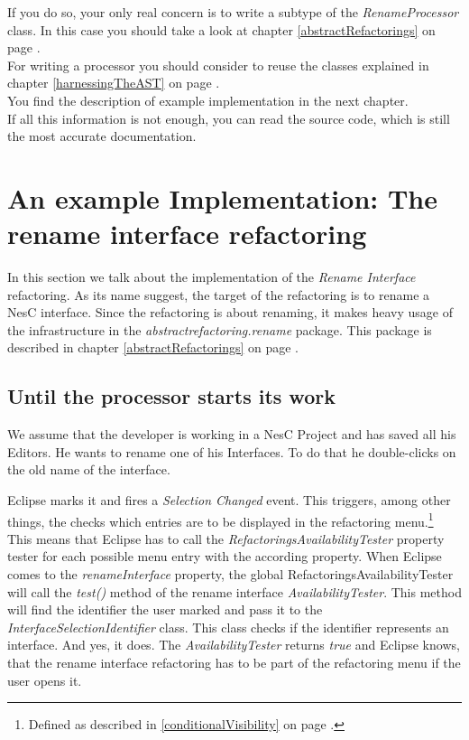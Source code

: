 \documentclass[a4paper,10pt]{report}
\begin{document}
If you do so, your only real concern is to write a subtype of the {\it RenameProcessor} class.
In this case you should take a look at chapter \ref{abstractRefactorings} on page \pageref{abstractRefactorings}.\\
For writing a processor you should consider to reuse the classes explained in chapter \ref{harnessingTheAST} on page \pageref{harnessingTheAST}.\\
You find the description of example implementation in the next chapter.\\
If all this information is not enough, you can read the source code, which is still the most accurate documentation.

\chapter{An example Implementation: The rename interface refactoring}
In this section we talk about the implementation of the {\it Rename Interface} refactoring. As its name suggest,
the target of the refactoring is to rename a NesC interface.
Since the refactoring is about renaming, it makes heavy usage of the infrastructure in the {\it abstractrefactoring.rename} package.
This package is described in chapter \ref{abstractRefactorings} on page \pageref{abstractRefactorings}.

\section{Until the processor starts its work}
We assume that the developer is working in a NesC Project and has saved all his Editors.
He wants to rename one of his Interfaces. To do that he double-clicks on the old name of the interface. 

Eclipse marks it and fires a {\it Selection Changed} event. 
This triggers, among other things, the checks which entries are to be displayed in the refactoring menu.\footnote{Defined as described in \ref{conditionalVisibility} on page \pageref{conditionalVisibility}.}
This means that Eclipse has to call the {\it RefactoringsAvailabilityTester} property tester for each possible menu entry with the according property.
When Eclipse comes to the {\it  renameInterface} property, the global RefactoringsAvailabilityTester will call the {\it test()} method of the rename interface {\it AvailabilityTester}.
This method will find the identifier the user marked and pass it to the {\it InterfaceSelectionIdentifier} class.
This class checks if the identifier represents an interface.
And yes, it does. 
The {\it AvailabilityTester} returns {\it true} and Eclipse knows, that the rename interface refactoring has to be part of the refactoring menu if the user opens it.
\end{document}
